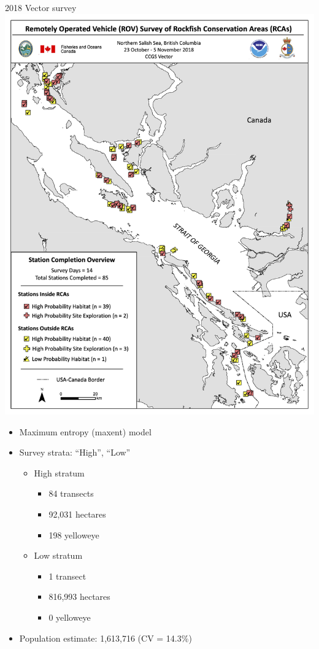 \documentclass[
  ignorenonframetext,
]{beamer}
\providecommand{\tightlist}{%
  \setlength{\itemsep}{0pt}\setlength{\parskip}{0pt}}
\begin{document}
\begin{frame}{2018 Vector survey}
\protect\hypertarget{vector-survey}{}
\includegraphics[width=1\textwidth,height=\textheight]{2018_vector_map.png}

\begin{itemize}
\tightlist
\item
  Maximum entropy (maxent) model
\item
  Survey strata: ``High'', ``Low''

  \begin{itemize}
  \tightlist
  \item
    High stratum

    \begin{itemize}
    \tightlist
    \item
      84 transects
    \item
      92,031 hectares
    \item
      198 yelloweye
    \end{itemize}
  \item
    Low stratum

    \begin{itemize}
    \tightlist
    \item
      1 transect
    \item
      816,993 hectares
    \item
      0 yelloweye
    \end{itemize}
  \end{itemize}
\item
  Population estimate: 1,613,716 (CV = 14.3\%)
\end{itemize}
\end{frame}
\end{document}
